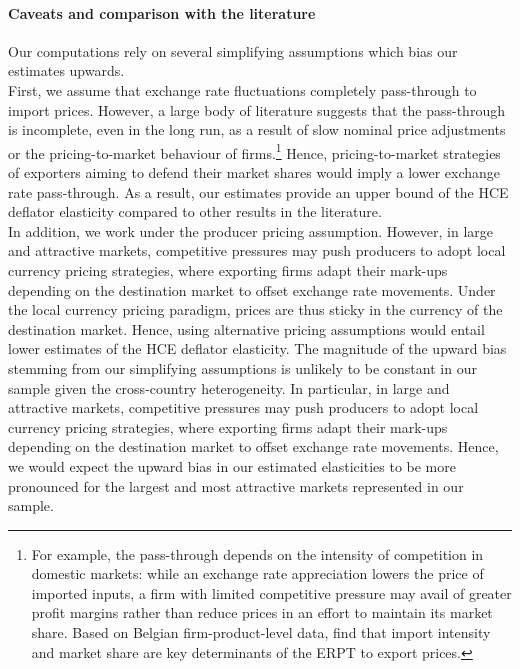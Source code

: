\documentclass[11pt,a4paper]{paper} %
\begin{document}
\paragraph{Caveats and comparison with the literature}
Our computations rely on several simplifying assumptions which bias our estimates upwards.\\
First, we assume that exchange rate fluctuations completely pass-through to import prices. 
However, a large body of literature suggests that the pass-through is incomplete, even in the long run, as a
result of slow nominal price adjustments or the pricing-to-market behaviour of firms.\footnote{For example, the pass-through depends on the intensity
of competition in domestic markets: while an exchange rate appreciation lowers the price of imported inputs, a firm with limited competitive pressure may avail of greater profit margins rather than reduce prices in an effort to maintain its market share. Based on Belgian firm-product-level data, \cite{Amiti2014} find that import intensity and market share are key determinants of the ERPT to export prices.} 
Hence, pricing-to-market strategies of exporters aiming to defend their market shares would imply a lower exchange rate pass-through. 
As a result, our estimates provide an upper bound of the HCE deflator elasticity compared to other results in the literature.\\
In addition, we work under the producer pricing assumption. 
However, in large and attractive markets, competitive pressures may push producers to adopt local currency pricing strategies,
where exporting firms adapt their mark-ups depending on the destination market to offset exchange rate movements. 
Under the local currency pricing paradigm, prices are thus sticky in the currency of the destination market. 
Hence, using alternative pricing assumptions would entail lower estimates of the HCE deflator elasticity.
The magnitude of the upward bias stemming from our simplifying assumptions is unlikely to be constant in our sample given the cross-country heterogeneity.
In particular, in large and attractive markets, competitive pressures may push producers to adopt local currency pricing strategies, where exporting firms adapt their mark-ups depending on the destination market to offset exchange rate movements. 
Hence, we would expect the upward bias in our estimated elasticities to be more pronounced for the largest and most attractive markets represented in our sample.\\
\end{document}
